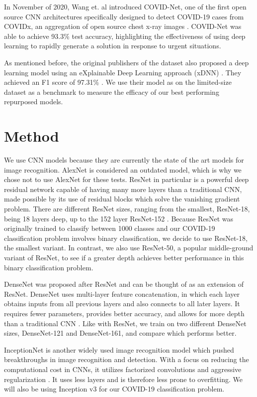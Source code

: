 \documentclass{article}
\begin{document}
In November of 2020, Wang et. al introduced COVID-Net, one of the first open source CNN architectures specifically designed to detect COVID-19 cases from COVIDx, an aggregation of open source chest x-ray images \cite{Wang2020}. COVID-Net was able to achieve 93.3\% test accuracy, highlighting the effectiveness of using deep learning to rapidly generate a solution in response to urgent situations.

As mentioned before, the original publishers of the dataset also proposed a deep learning model using an eXplainable Deep Learning approach (xDNN) \cite{xie2020explainable}. They achieved an F1 score of 97.31\% \cite{Soares2020}. We use their model as on the limited-size dataset as a benchmark to measure the efficacy of our best performing repurposed models.

\section{Method}
We use CNN models because they are currently the state of the art models for image recognition. AlexNet is considered an outdated model, which is why we chose not to use AlexNet for these tests. ResNet in particular is a powerful deep residual network capable of having many more layers than a traditional CNN, made possible by its use of residual blocks which solve the vanishing gradient problem. There are different ResNet sizes, ranging from the smallest, ResNet-18, being 18 layers deep, up to the 152 layer ResNet-152 \cite{ResNet}. Because ResNet was originally trained to classify between 1000 classes and our COVID-19 classification problem involves binary classification, we decide to use ResNet-18, the smallest variant. In contrast, we also use ResNet-50, a popular middle-ground variant of ResNet, to see if a greater depth achieves better performance in this binary classification problem.

DenseNet was proposed after ResNet and can be thought of as an extension of ResNet. DenseNet uses multi-layer feature concatenation, in which each layer obtains inputs from all previous layers and also connects to all later layers. It requires fewer parameters, provides better accuracy, and allows for more depth than a traditional CNN \cite{DenseNet}. Like with ResNet, we train on two different DenseNet sizes, DenseNet-121 and DenseNet-161, and compare which performs better.

InceptionNet is another widely used image recognition model which pushed breakthroughs in image recognition and detection. With a focus on reducing the computational cost in CNNs, it utilizes factorized convolutions and aggressive regularization \cite{Inception}. It uses less layers and is therefore less prone to overfitting. We will also be using Inception v3 for our COVID-19 classification problem.
\end{document}
